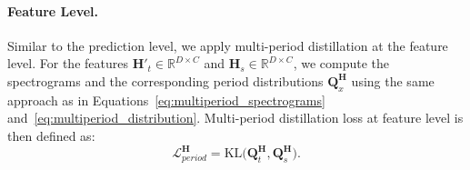 
\vspace{-0.5em}
\paragraph{Feature Level.}
Similar to the prediction level, we apply multi-period distillation at the feature level. For the features \(\mathbf{H}'_t \in \mathbb{R}^{D \times C}\) and \(\mathbf{H}_s \in \mathbb{R}^{D \times C}\), we compute the spectrograms and the corresponding period distributions \(\mathbf{Q}_x^\mathbf{H}\) using the same approach as in Equations~\ref{eq:multiperiod_spectrograms} and~\ref{eq:multiperiod_distribution}. Multi-period distillation loss at feature level is then defined as:
\begin{equation}
    \mathcal{L}_{period}^\mathbf{H} = \text{KL}\bigl(\mathbf{Q}_t^\mathbf{H}, \mathbf{Q}_s^\mathbf{H}\bigr).
\end{equation}

